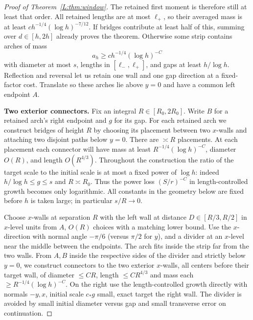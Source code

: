 \documentclass[11pt]{article}
\numberwithin{equation}{section}
\theoremstyle{definition}\newtheorem{definition}[theorem]{Definition}
\theoremstyle{remark}\newtheorem{remark}[theorem]{Remark}
\begin{document}
\begin{proof}[Proof of Theorem~\ref{L:thm:window}]
The retained first moment is therefore still at least that order.
All retained lengths are at most $\ell_+$, so their averaged mass is
at least $ch^{-1/4}(\log h)^{-7/12}$.  If bridges contribute at least
half of this, summing over $d\in[h,2h]$ already proves the theorem.
Otherwise some strip contains arches of mass
\[
 a_h\ge c h^{-1/4}(\log h)^{-C}
\]
with diameter at most $s$, lengths in $[\ell_-,\ell_+]$, and gaps
at least $h/\log h$.  Reflection and reversal let us retain one
wall and one gap direction at a fixed-factor cost.  Translate so
these arches lie above $y=0$ and have a common left endpoint $A$.

  \textbf{Two exterior connectors.}
Fix an integral $R\in[R_0,2R_0]$.  Write $B$ for a retained arch's
right endpoint and $g$ for its gap.  For each retained arch we construct
bridges of height $R$ by choosing its placement between two $x$-walls
and attaching two disjoint paths below $y=0$.  There are $\asymp R$
placements.  At each placement each connector will have mass at least
$R^{-1/4}(\log h)^{-C}$, diameter $O(R)$, and length $O(R^{4/3})$.
Throughout the construction the ratio of the target scale to the
initial scale is at most a fixed power of $\log h$: indeed
$h/\log h\le g\le s$ and $R\asymp R_0$.  Thus the power loss
$(S/r)^{-C}$ in length-controlled growth becomes only logarithmic.
All constants in the geometry below are fixed before $h$ is taken
large; in particular $s/R\to0$.

Choose \(x\)-walls at separation \(R\) with the left wall at distance \(D\in[R/3,R/2]\) in \(x\)-level units from \(A\), \(O(R)\) choices with a matching lower bound. Use the \(x\)-direction with normal angle \(-\pi/6\) (versus \(\pi/2\) for \(y\)), and a divider at an \(x\)-level near the middle between the endpoints. The arch fits inside the strip far from the two walls. From \(A,B\) inside the respective sides of the divider and strictly below \(y=0\), we construct connectors to the two exterior \(x\)-walls, all centers before their target wall, of diameter \(\le C R\), length \(\le C R^{4/3}\) and mass each \(\ge R^{-1/4}(\log h)^{-C}\). On the right use the length-controlled growth directly with normals \(-y,x\), initial scale \(c_* g\) small, exact target the right wall. The divider is avoided by small initial diameter versus gap and small transverse error on continuation.


\end{proof}
\end{document}
